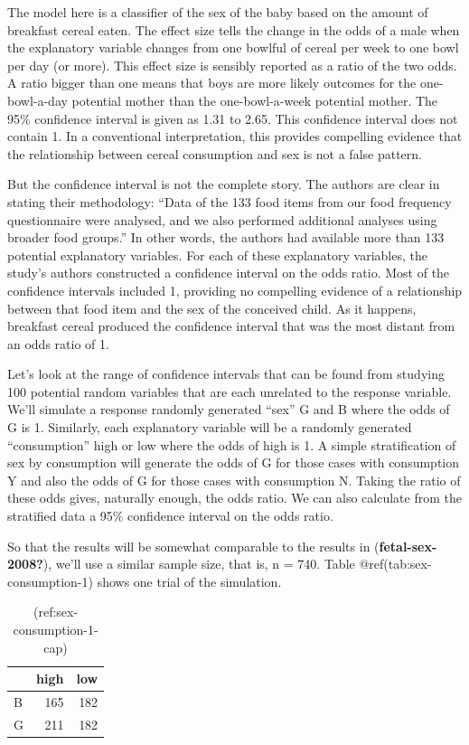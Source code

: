 \documentclass[
  letterpaper,
  DIV=11,
  numbers=noendperiod,
  oneside]{scrreprt}
\begin{document}
The model here is a classifier of the sex of the baby based on the
amount of breakfast cereal eaten. The effect size tells the change in
the odds of a male when the explanatory variable changes from one
bowlful of cereal per week to one bowl per day (or more). This effect
size is sensibly reported as a ratio of the two odds. A ratio bigger
than one means that boys are more likely outcomes for the one-bowl-a-day
potential mother than the one-bowl-a-week potential mother. The 95\%
confidence interval is given as 1.31 to 2.65. This confidence interval
does not contain 1. In a conventional interpretation, this provides
compelling evidence that the relationship between cereal consumption and
sex is not a false pattern.

But the confidence interval is not the complete story. The authors are
clear in stating their methodology: ``Data of the 133 food items from
our food frequency questionnaire were analysed, and we also performed
additional analyses using broader food groups.'' In other words, the
authors had available more than 133 potential explanatory variables. For
each of these explanatory variables, the study's authors constructed a
confidence interval on the odds ratio. Most of the confidence intervals
included 1, providing no compelling evidence of a relationship between
that food item and the sex of the conceived child. As it happens,
breakfast cereal produced the confidence interval that was the most
distant from an odds ratio of 1.

Let's look at the range of confidence intervals that can be found from
studying 100 potential random variables that are each unrelated to the
response variable. We'll simulate a response randomly generated ``sex''
G and B where the odds of G is 1. Similarly, each explanatory variable
will be a randomly generated ``consumption'' high or low where the odds
of high is 1. A simple stratification of sex by consumption will
generate the odds of G for those cases with consumption Y and also the
odds of G for those cases with consumption N. Taking the ratio of these
odds gives, naturally enough, the odds ratio. We can also calculate from
the stratified data a 95\% confidence interval on the odds ratio.

So that the results will be somewhat comparable to the results in
(\textbf{fetal-sex-2008?}), we'll use a similar sample size, that is, n
= 740. Table @ref(tab:sex-consumption-1) shows one trial of the
simulation.

\begin{table}

\caption{(ref:sex-consumption-1-cap)}
\centering
\begin{tabular}[t]{l|r|r}
\hline
  & high & low\\
\hline
B & 165 & 182\\
\hline
G & 211 & 182\\
\hline
\end{tabular}
\end{table}
\end{document}
